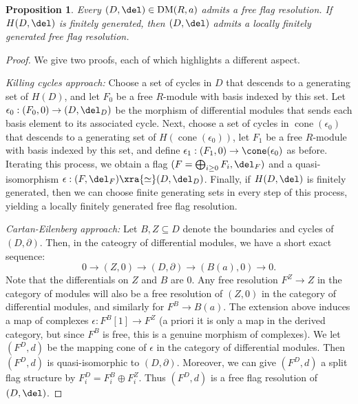 \documentclass[12pt]{amsart}
\newtheorem{prop}[lemma]{Proposition}
\theoremstyle{definition}
\theoremstyle{remark}
\newcommand{\michael}[1]{{\color{red} \sf $\clubsuit\clubsuit\clubsuit$ Michael: [#1]}}
\def\on{\operatorname}
\def\DM{\operatorname{DM}}
\begin{document}
\begin{prop}
\label{resexists}
Every $(D, \del) \in \DM(R, a)$ admits a free flag resolution. If $H(D, \del)$ is finitely generated, then $(D, \del)$ admits a locally finitely generated free flag resolution.
\end{prop}

\begin{proof}


We give two proofs, each of which highlights a different aspect.

{\em Killing cycles approach:} 
Choose a set of cycles in $D$ that descends to a generating set of $H(D)$, and let $F_0$ be a free $R$-module with basis indexed by this set. Let $\epsilon_0 : (F_0, 0) \to (D, \del_D)$ be the morphism of differential modules that sends each basis element to its associated cycle. Next, choose a set of cycles in $\on{cone}(\epsilon_0)$ that descends to a generating set of $H(\on{cone}(\epsilon_0))$, let $F_1$ be a free $R$-module with basis indexed by this set, and define $\epsilon_1 : (F_1, 0) \to \cone(\epsilon_0)$ as before. Iterating this process, we obtain a flag $(F = \bigoplus_{i \ge 0} F_i, \del_F)$ 
and a quasi-isomorphism $\epsilon : (F, \del_F) \xra{\simeq} (D, \del_D)$. Finally, if $H(D, \del)$ is finitely generated, then we can choose finite generating sets in every step of this process, yielding a locally finitely generated free flag resolution. 

{\em Cartan-Eilenberg approach:} Let $B,Z\subseteq D$ denote the boundaries and cycles of $(D,\partial)$.  Then, in the cateogry of differential modules, we have a short exact sequence:
\[
0\to (Z,0) \to (D,\partial) \to (B(a),0)\to 0.
\]
Note that the differentials on $Z$ and $B$ are $0$.  Any free resolution $F^Z\to Z$ in the category of modules will also be a free resolution of $(Z,0)$ in the category of differential modules, and similarly for $F^B\to B(a)$.   The extension above induces a map of complexes $\epsilon: F^B[1]\to F^Z$ (a priori it is only a map in the derived category, but since $F^B$ is free, this is a genuine morphism of complexes). We let $(F^D,d)$ be the mapping cone of $\epsilon$ in the category of differential modules.  Then $(F^D,d)$ is quasi-isomorphic to $(D,\partial)$.  Moreover, we can give $(F^D,d)$ a split flag structure by $F^D_i = F^B_i\oplus F^Z_i$.  Thus $(F^D,d)$ is a free flag resolution of $(D,\del)$.
\end{proof}
\end{document}
